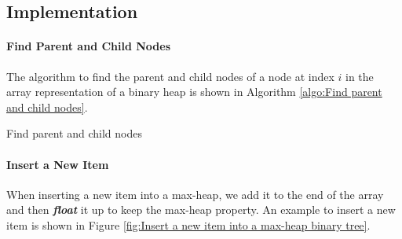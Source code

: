 \documentclass[12pt,a4paper]{ctexart}
\newcommand{\highlight}[1]{\textbf{\textit{#1}}}
\begin{document}
    \subsection{Implementation}

    \paragraph{Find Parent and Child Nodes}

    The algorithm to find the parent and child nodes of a node at index $i$ in the array representation of a binary heap is shown in Algorithm \ref{algo:Find parent and child nodes}.

    \begin{algorithm}[!htbp]
        \caption{Find parent and child nodes}
        \label{algo:Find parent and child nodes}

        \BlankLine


        \BlankLine

    \end{algorithm}

    \paragraph{Insert a New Item}

    When inserting a new item into a max-heap, we add it to the end of the array and then \highlight{float} it up to keep the max-heap property. An example to insert a new item is shown in Figure \ref{fig:Insert a new item into a max-heap binary tree}.
\end{document}
